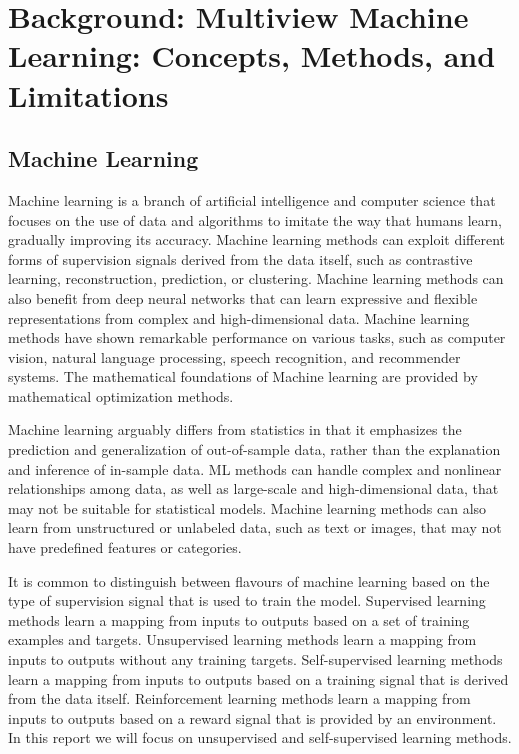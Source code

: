\chapter{Background: Multiview Machine Learning: Concepts, Methods, and Limitations}
\label{chap:background}

\section{Machine Learning}

Machine learning is a branch of artificial intelligence and computer science that focuses on the use of data and algorithms to imitate the way that humans learn, gradually improving its accuracy. Machine learning methods can exploit different forms of supervision signals derived from the data itself, such as contrastive learning, reconstruction, prediction, or clustering. Machine learning methods can also benefit from deep neural networks that can learn expressive and flexible representations from complex and high-dimensional data. Machine learning methods have shown remarkable performance on various tasks, such as computer vision, natural language processing, speech recognition, and recommender systems. The mathematical foundations of Machine learning are provided by mathematical optimization methods.

Machine learning arguably differs from statistics in that it emphasizes the prediction and generalization of out-of-sample data, rather than the explanation and inference of in-sample data. ML methods can handle complex and nonlinear relationships among data, as well as large-scale and high-dimensional data, that may not be suitable for statistical models. Machine learning methods can also learn from unstructured or unlabeled data, such as text or images, that may not have predefined features or categories.

It is common to distinguish between flavours of machine learning based on the type of supervision signal that is used to train the model. Supervised learning methods learn a mapping from inputs to outputs based on a set of training examples and targets. Unsupervised learning methods learn a mapping from inputs to outputs without any training targets. Self-supervised learning methods learn a mapping from inputs to outputs based on a training signal that is derived from the data itself. Reinforcement learning methods learn a mapping from inputs to outputs based on a reward signal that is provided by an environment. In this report we will focus on unsupervised and self-supervised learning methods.

